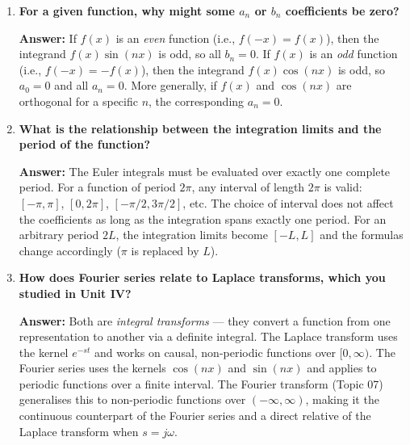 \documentclass[12pt,a4paper]{article}
\begin{document}
\begin{enumerate}[label=\textbf{Q\arabic*.}]
\textbf{Answer:} At a jump discontinuity, the Fourier series converges to the average of the left-hand limit and the right-hand limit:
$S(x_0) = \frac{1}{2}\left[f(x_0^-) + f(x_0^+)\right]$.
Near the discontinuity, the partial sums exhibit an overshoot of approximately $9\%$ of the jump height that does not diminish as more terms are added --- this is the \textbf{Gibbs phenomenon}.

\item \textbf{For a given function, why might some $a_n$ or $b_n$ coefficients be zero?}

\textbf{Answer:} If $f(x)$ is an \emph{even} function (i.e., $f(-x) = f(x)$), then the integrand $f(x)\sin(nx)$ is odd, so all $b_n = 0$.
If $f(x)$ is an \emph{odd} function (i.e., $f(-x) = -f(x)$), then the integrand $f(x)\cos(nx)$ is odd, so $a_0 = 0$ and all $a_n = 0$.
More generally, if $f(x)$ and $\cos(nx)$ are orthogonal for a specific $n$, the corresponding $a_n = 0$.

\item \textbf{What is the relationship between the integration limits and the period of the function?}

\textbf{Answer:} The Euler integrals must be evaluated over exactly one complete period.
For a function of period $2\pi$, any interval of length $2\pi$ is valid: $[-\pi, \pi]$, $[0, 2\pi]$, $[-\pi/2, 3\pi/2]$, etc.
The choice of interval does not affect the coefficients as long as the integration spans exactly one period.
For an arbitrary period $2L$, the integration limits become $[-L, L]$ and the formulas change accordingly ($\pi$ is replaced by $L$).

\item \textbf{How does Fourier series relate to Laplace transforms, which you studied in Unit IV?}

\textbf{Answer:} Both are \emph{integral transforms} --- they convert a function from one representation to another via a definite integral.
The Laplace transform uses the kernel $e^{-st}$ and works on causal, non-periodic functions over $[0, \infty)$.
The Fourier series uses the kernels $\cos(nx)$ and $\sin(nx)$ and applies to periodic functions over a finite interval.
The Fourier transform (Topic 07) generalises this to non-periodic functions over $(-\infty, \infty)$, making it the continuous counterpart of the Fourier series and a direct relative of the Laplace transform when $s = j\omega$.

\end{enumerate}
\end{document}
